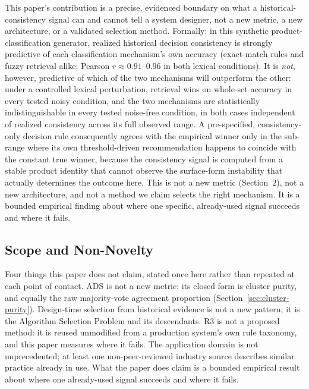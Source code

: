 \documentclass[11pt]{article}
\begin{document}
This paper's contribution is a precise, evidenced boundary on what a
historical-consistency signal can and cannot tell a system designer, not a
new metric, a new architecture, or a validated selection method. Formally: in
this synthetic product-classification generator, realized historical decision
consistency is strongly predictive of each classification mechanism's own
accuracy (exact-match rules and fuzzy retrieval alike; Pearson $r\approx
0.91$--$0.96$ in both lexical conditions). It is \emph{not}, however,
predictive of which of the two mechanisms will outperform the other: under a controlled
lexical perturbation, retrieval wins on whole-set accuracy in every tested
noisy condition, and the two mechanisms are statistically indistinguishable
in every tested noise-free condition, in both cases independent of realized
consistency across its full observed range. A pre-specified,
consistency-only decision rule consequently agrees with the empirical winner
only in the sub-range where its own threshold-driven recommendation happens
to coincide with the constant true winner, because the consistency signal is
computed from a stable product identity that cannot observe the surface-form
instability that actually determines the outcome here. This is not a new
metric (Section~2), not a new architecture, and not a method we claim
selects the right mechanism. It is a bounded empirical finding about where
one specific, already-used signal succeeds and where it fails.

\subsection{Scope and Non-Novelty}
\label{sec:scope-non-novelty}

Four things this paper does not claim, stated once here rather than repeated
at each point of contact. ADS is not a new metric: its closed form is cluster
purity, and equally the raw majority-vote agreement proportion
(Section~\ref{sec:cluster-purity}). Design-time selection from historical
evidence is not a new pattern; it is the Algorithm Selection Problem
\citep{rice1976} and its descendants. R3 is not a proposed method: it is
reused unmodified from a production system's own rule taxonomy, and this
paper measures where it fails. The application domain is not unprecedented;
at least one non-peer-reviewed industry source \citep{kenfromfinance2025}
describes similar practice already in use. What the paper does claim is a
bounded empirical result about where one already-used signal succeeds and
where it fails.
\end{document}
